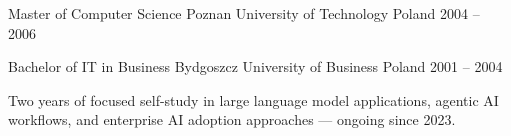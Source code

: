 
\begin{cventries}

  \cventry
    {Master of Computer Science} %
    {Poznan University of Technology} %
    {Poland} %
    {2004 -- 2006} %
    {}

  \cventry
    {Bachelor of IT in Business} %
    {Bydgoszcz University of Business} %
    {Poland} %
    {2001 -- 2004} %
    {}

\end{cventries}

\vspace{4mm}


\begin{cvparagraph}

Two years of focused self-study in large language model applications, agentic AI workflows, and enterprise AI adoption approaches — ongoing since 2023.

\end{cvparagraph}
